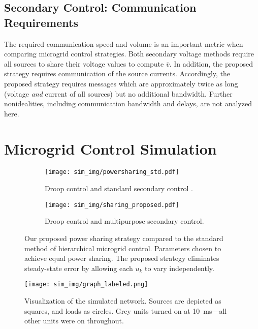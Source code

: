 \documentclass[letterpaper, 10 pt, conference]{ieeeconf}
\begin{document}
\subsection{Secondary Control: Communication Requirements}

The required communication speed and volume is an important metric when comparing microgrid control strategies. Both secondary voltage methods require all sources to share their voltage values to compute $\overline{v}$. In addition, the proposed strategy requires communication of the source currents. Accordingly, the proposed strategy requires messages which are approximately twice as long (voltage \textit{and} current of all sources) but no additional bandwidth. Further nonidealities, including communication bandwidth and delays, are not analyzed here.

\section{Microgrid Control Simulation}\label{sec:sim}

\begin{figure*}[t!]
\begin{subfigure}{.43\textwidth}
  \centering
  \texttt{[image: sim\_img/powersharing\_std.pdf]}
  \caption{Droop control and standard secondary control \cite{GuerreroHierarchy}.}
  \label{fig:power_std}
\end{subfigure}
\hfill
\begin{subfigure}{.5\textwidth}
  \centering
  \texttt{[image: sim\_img/sharing\_proposed.pdf]}
  \caption{Droop control and multipurpose secondary control.}
  \label{fig:power_us}
\end{subfigure}
\caption{Our proposed power sharing strategy compared to the standard method of hierarchical microgrid control. Parameters chosen to achieve equal power sharing. The proposed strategy eliminates steady-state error by allowing each $u_k$ to vary independently.}
\label{fig:power}
\end{figure*}

\begin{figure}[t!]
\centering
    \texttt{[image: sim\_img/graph\_labeled.png]}
    \caption{Visualization of the simulated network. Sources are depicted as squares, and loads as circles. Grey units turned on at \SI{10}{ms}---all other units were on throughout.}
    \label{graph}
\end{figure}
\end{document}
